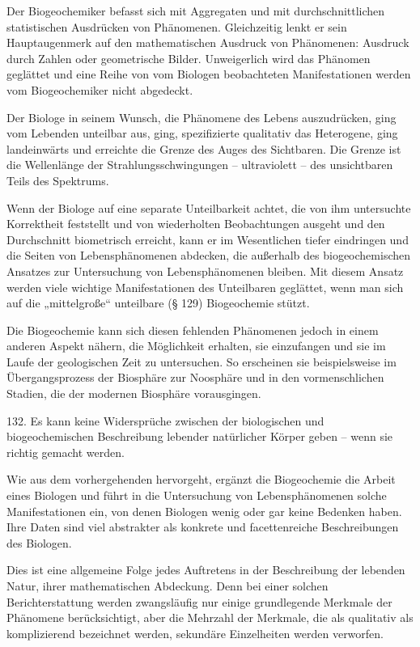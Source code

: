 \documentclass[11pt,a4paper]{book}
\begin{document}
Der Biogeochemiker befasst sich mit Aggregaten und mit durchschnittlichen statistischen Ausdrücken von Phänomenen. Gleichzeitig lenkt er sein Hauptaugenmerk auf den mathematischen Ausdruck von Phänomenen: Ausdruck durch Zahlen oder geometrische Bilder. Unweigerlich wird das Phänomen geglättet und eine Reihe von vom Biologen beobachteten Manifestationen werden vom Biogeochemiker nicht abgedeckt.



Der Biologe in seinem Wunsch, die Phänomene des Lebens auszudrücken, ging vom Lebenden unteilbar aus, ging, spezifizierte qualitativ das Heterogene, ging landeinwärts und erreichte die Grenze des Auges des Sichtbaren. Die Grenze ist die Wellenlänge der Strahlungsschwingungen -- ultraviolett -- des unsichtbaren Teils des Spektrums.



Wenn der Biologe auf eine separate Unteilbarkeit achtet, die von ihm untersuchte Korrektheit feststellt und von wiederholten Beobachtungen ausgeht und den Durchschnitt biometrisch erreicht, kann er im Wesentlichen tiefer eindringen und die Seiten von Lebensphänomenen abdecken, die außerhalb des biogeochemischen Ansatzes zur Untersuchung von Lebensphänomenen bleiben. Mit diesem Ansatz werden viele wichtige Manifestationen des Unteilbaren geglättet, wenn man sich auf die „mittelgroße“ unteilbare (§ 129) Biogeochemie stützt.



Die Biogeochemie kann sich diesen fehlenden Phänomenen jedoch in einem anderen Aspekt nähern, die Möglichkeit erhalten, sie einzufangen und sie im Laufe der geologischen Zeit zu untersuchen. So erscheinen sie beispielsweise im Übergangsprozess der Biosphäre zur Noosphäre und in den vormenschlichen Stadien, die der modernen Biosphäre vorausgingen.



132. Es kann keine Widersprüche zwischen der biologischen und biogeochemischen Beschreibung lebender natürlicher Körper geben -- wenn sie richtig gemacht werden.



Wie aus dem vorhergehenden hervorgeht, ergänzt die Biogeochemie die Arbeit eines Biologen und führt in die Untersuchung von Lebensphänomenen solche Manifestationen ein, von denen Biologen wenig oder gar keine Bedenken haben. Ihre Daten sind viel abstrakter als konkrete und facettenreiche Beschreibungen des Biologen.



Dies ist eine allgemeine Folge jedes Auftretens in der Beschreibung der lebenden Natur, ihrer mathematischen Abdeckung. Denn bei einer solchen Berichterstattung werden zwangsläufig nur einige grundlegende Merkmale der Phänomene berücksichtigt, aber die Mehrzahl der Merkmale, die als qualitativ als komplizierend bezeichnet werden, sekundäre Einzelheiten werden verworfen.
\end{document}
